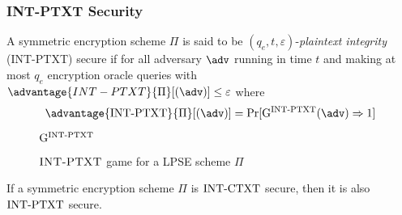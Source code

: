 \subsubsection{INT-PTXT Security}
A symmetric encryption scheme $\Pi$ is said to be $(q_e, t, \varepsilon)$-\textit{plaintext integrity} (INT-PTXT) secure if for all adversary $\adv$ running in time $t$ and making at most $q_e$ encryption oracle queries with $\advantage{INT-PTXT}{\Pi}[(\adv)] \leq \varepsilon$ where 
$$
\advantage{\intptxt}{\Pi}[(\adv)] = \Pr[\mathrm{G}^{\intptxt}(\adv) \Rightarrow 1]
$$

\begin{figure}[!h]
\centering
\begin{codeframe}[colback = white, width=10.5cm, height=6cm]{$\mathrm{G}^{\mathrm{INT\textrm-PTXT}}$}
\begin{pchstack}[space=0.5cm]
\begin{pcvstack}[space=0.3cm]

\end{pcvstack}

\begin{pcvstack}[space=0.3cm]

\end{pcvstack}
\end{pchstack}
\end{codeframe}
\caption{$\textsc{INT-PTXT}$ game for a LPSE scheme $\Pi$}
\label{fig:int-ptxt-game}
\end{figure}


\begin{theorem}
If a symmetric encryption scheme $\Pi$ is $\mathrm{INT\textrm-CTXT}$ secure, then it is also $\mathrm{INT\textrm-PTXT}$ secure. 
\end{theorem}

